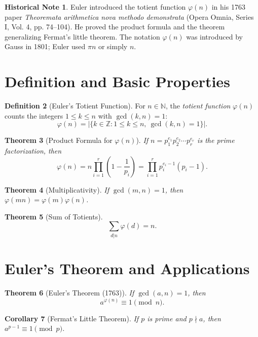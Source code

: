 \documentclass[11pt,a4paper,twoside]{book}
\theoremstyle{eulerstyle}
\newtheorem{theorem}{Theorem}[chapter]
\newtheorem{corollary}[theorem]{Corollary}
\theoremstyle{definition}
\newtheorem{definition}[theorem]{Definition}
\newtheorem{historical}[theorem]{Historical Note}
\newcommand{\Z}{\mathbb{Z}}
\newcommand{\N}{\mathbb{N}}
\begin{document}
\begin{historical}
Euler introduced the totient function $\varphi(n)$ in his 1763 paper \emph{Theoremata arithmetica nova methodo demonstrata} (Opera Omnia, Series I, Vol. 4, pp. 74--104). He proved the product formula and the theorem generalizing Fermat's little theorem. The notation $\varphi(n)$ was introduced by Gauss in 1801; Euler used $\pi n$ or simply $n$. \cite{euler1763}\end{historical}

\section{Definition and Basic Properties}

\begin{definition}[Euler's Totient Function]
For $n \in \N$, the \emph{totient function} $\varphi(n)$ counts the integers $1 \le k \le n$ with $\gcd(k,n)=1$:
\[
\varphi(n) = |\{k \in \Z : 1 \le k \le n,\ \gcd(k,n) = 1\}|.
\]
\end{definition}

\begin{theorem}[Product Formula for $\varphi(n)$]
If $n = p_1^{e_1} p_2^{e_2} \cdots p_r^{e_r}$ is the prime factorization, then
\[
\varphi(n) = n \prod_{i=1}^r \left(1 - \frac{1}{p_i}\right)
= \prod_{i=1}^r p_i^{e_i-1}(p_i - 1).
\]
\end{theorem}

\begin{theorem}[Multiplicativity]
If $\gcd(m,n)=1$, then $\varphi(mn) = \varphi(m)\varphi(n)$.
\end{theorem}

\begin{theorem}[Sum of Totients]
\[
\sum_{d|n} \varphi(d) = n.
\]
\end{theorem}

\section{Euler's Theorem and Applications}

\begin{theorem}[Euler's Theorem (1763)]
If $\gcd(a,n)=1$, then
\[
a^{\varphi(n)} \equiv 1 \pmod{n}.
\]
\end{theorem}

\begin{corollary}[Fermat's Little Theorem]
If $p$ is prime and $p \nmid a$, then $a^{p-1} \equiv 1 \pmod{p}$.
\end{corollary}
\end{document}
